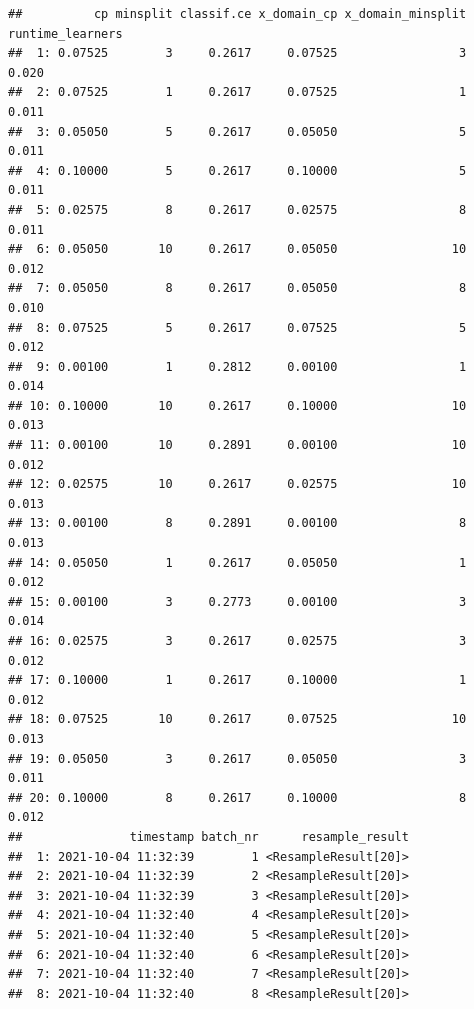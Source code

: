 \documentclass[
]{scrbook}
\newenvironment{Shaded}{\begin{snugshade}}{\end{snugshade}}
\newcommand{\FunctionTok}[1]{\textcolor[rgb]{0.00,0.00,0.00}{#1}}
\newcommand{\NormalTok}[1]{#1}
\newcommand{\SpecialCharTok}[1]{\textcolor[rgb]{0.00,0.00,0.00}{#1}}
\renewenvironment{Shaded} {\begin{snugshade}\small} {\end{snugshade}}
\begin{document}
\begin{Shaded}
\end{Shaded}

\begin{verbatim}
##          cp minsplit classif.ce x_domain_cp x_domain_minsplit runtime_learners
##  1: 0.07525        3     0.2617     0.07525                 3            0.020
##  2: 0.07525        1     0.2617     0.07525                 1            0.011
##  3: 0.05050        5     0.2617     0.05050                 5            0.011
##  4: 0.10000        5     0.2617     0.10000                 5            0.011
##  5: 0.02575        8     0.2617     0.02575                 8            0.011
##  6: 0.05050       10     0.2617     0.05050                10            0.012
##  7: 0.05050        8     0.2617     0.05050                 8            0.010
##  8: 0.07525        5     0.2617     0.07525                 5            0.012
##  9: 0.00100        1     0.2812     0.00100                 1            0.014
## 10: 0.10000       10     0.2617     0.10000                10            0.013
## 11: 0.00100       10     0.2891     0.00100                10            0.012
## 12: 0.02575       10     0.2617     0.02575                10            0.013
## 13: 0.00100        8     0.2891     0.00100                 8            0.013
## 14: 0.05050        1     0.2617     0.05050                 1            0.012
## 15: 0.00100        3     0.2773     0.00100                 3            0.014
## 16: 0.02575        3     0.2617     0.02575                 3            0.012
## 17: 0.10000        1     0.2617     0.10000                 1            0.012
## 18: 0.07525       10     0.2617     0.07525                10            0.013
## 19: 0.05050        3     0.2617     0.05050                 3            0.011
## 20: 0.10000        8     0.2617     0.10000                 8            0.012
##               timestamp batch_nr      resample_result
##  1: 2021-10-04 11:32:39        1 <ResampleResult[20]>
##  2: 2021-10-04 11:32:39        2 <ResampleResult[20]>
##  3: 2021-10-04 11:32:39        3 <ResampleResult[20]>
##  4: 2021-10-04 11:32:40        4 <ResampleResult[20]>
##  5: 2021-10-04 11:32:40        5 <ResampleResult[20]>
##  6: 2021-10-04 11:32:40        6 <ResampleResult[20]>
##  7: 2021-10-04 11:32:40        7 <ResampleResult[20]>
##  8: 2021-10-04 11:32:40        8 <ResampleResult[20]>

\end{verbatim}
\end{document}
